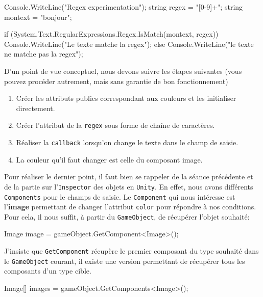 \documentclass[a4paper,10pt]{article}
\newenvironment{info}%
{\begin{tcolorbox}[breakable,colback=green!5!white,colframe=green!75!black,title=Information]}%
{\end{tcolorbox}}
\newenvironment{boxcode}%
{\begin{tcolorbox}[breakable,colback=gray!5!white,colframe=black]}%
	{\end{tcolorbox}}
\begin{document}
\begin{boxcode}
\begin{csharpsansbord}
Console.WriteLine("Regex experimentation");
string regex = "[0-9]+";
string montext = "bonjour";

if (System.Text.RegularExpressions.Regex.IsMatch(montext, regex))
	Console.WriteLine("Le texte matche la regex");
else
	Console.WriteLine("le texte ne matche pas la regex");

\end{csharpsansbord}
\end{boxcode}


D'un point de vue conceptuel, nous devons suivre les étapes suivantes (vous pouvez procéder autrement, mais sans garantie de bon fonctionnement)%
\begin{enumerate}
	\item Créer les attributs publics correspondant aux couleurs et les initialiser directement.
	\item Créer l'attribut de la \texttt{regex} sous forme de chaîne de caractères.
	\item Réaliser la \texttt{callback} lorsqu'on change le texte dans le champ de saisie.
	\item La couleur qu'il faut changer est celle du composant image.
\end{enumerate}

\begin{info}
Pour réaliser le dernier point, il faut bien se rappeler de la séance précédente et de la partie sur l'\texttt{Inspector} des objets en \texttt{Unity}. En effet, %
nous avons différents \texttt{Components} pour le champs de saisie. Le \texttt{Component} qui nous intéresse est l'\textbf{image} permettant de changer l'attribut \texttt{color} pour répondre à nos conditions. Pour cela, il nous suffit, à partir du \texttt{GameObject}, de récupérer l'objet souhaité:

\begin{csharp}
Image image = gameObject.GetComponent<Image>();
\end{csharp}

J'insiste que \texttt{GetComponent} récupère le premier composant du type souhaité dans le \texttt{GameObject} courant, il existe une version permettant de récupérer tous les composants d'un type cible.
\begin{csharp}
Image[] images = gameObject.GetComponents<Image>();
\end{csharp}
\end{info}
\end{document}
